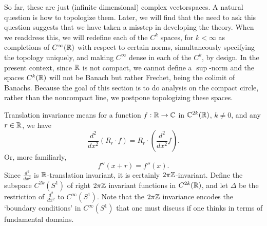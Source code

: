 \documentclass[12pt]{amsart}
\newcommand{\der}{\frac{d^2}{dx^2}}
\begin{document}
	So far, these are just (infinite dimensional) complex vectorspaces. A natural question is how to topologize them. Later, we will find that the need to ask this question suggests that we have taken a misstep in developing the theory. When we readdress this, we will redefine each of the $C^k$ spaces, for $k<\infty$ as completions of $C^\infty(\mathbb{R})$ with respect to certain norms, simultaneously specifying the topology uniquely, and making $C^\infty$ dense in each of the $C^k$, by design.  In the present context, since $\mathbb{R}$ is not compact, we cannot define a $\sup$-norm and the spaces $C^k(\mathbb{R})$ will not be Banach but rather Frechet, being the colimit of Banachs.  Because the goal of this section is to do analysis on the compact circle, rather than the noncompact line, we postpone topologizing these spaces.
	
	Translation invariance means for a function $f:\mathbb{R}\to \mathbb{C}$  in $\mathbb{C}^{2k}(\mathbb{R})$, $k\neq 0$, and any $r\in \mathbb{R}$, we have
		\begin{equation*}
			\der (R_r\cdot f)=R_r \cdot (\der f).
		\end{equation*}
	Or, more familiarly,
		\begin{equation*}
			f''(x+r)=f''(x).
		\end{equation*}	
	Since $\der$ is $\mathbb{R}$-translation invariant, it is certainly $2\pi \mathbb{Z}$-invariant. Define the subspace $C^{2k}(S^1)$ of right $2\pi \mathbb{Z}$ invariant functions in $C^{2k}(\mathbb{R})$, and let $\Delta$ be the restriction of $\der$ to $C^\infty(S^1)$.  Note that the $2\pi \mathbb{Z}$ invariance encodes the `boundary conditions'  in $C^\infty(S^1)$ that one must discuss if one thinks in terms of fundamental domains.
	
\end{document}
